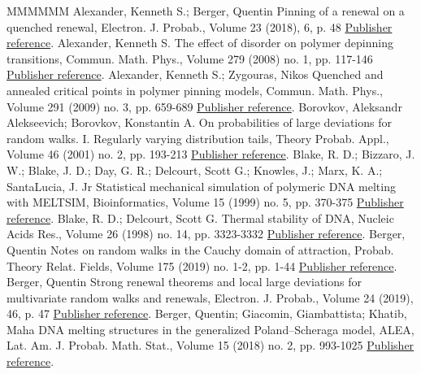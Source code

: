 \begin{thebibliography}{MMMMMM}
 Alexander, Kenneth S.; Berger, Quentin Pinning of a renewal on a quenched renewal, Electron. J. Probab., Volume 23 (2018), 6, p. 48 \href{https://ahl.centre-mersenne.org/item/AHL_2020__3__299_0/#cf:AB18}{Publisher reference}.
 Alexander, Kenneth S. The effect of disorder on polymer depinning transitions, Commun. Math. Phys., Volume 279 (2008) no. 1, pp. 117-146 \href{https://ahl.centre-mersenne.org/item/AHL_2020__3__299_0/#cf:A08}{Publisher reference}.
 Alexander, Kenneth S.; Zygouras, Nikos Quenched and annealed critical points in polymer pinning models, Commun. Math. Phys., Volume 291 (2009) no. 3, pp. 659-689 \href{https://ahl.centre-mersenne.org/item/AHL_2020__3__299_0/#cf:AZ09}{Publisher reference}.
 Borovkov, Aleksandr Alekseevich; Borovkov, Konstantin A. On probabilities of large deviations for random walks. I. Regularly varying distribution tails, Theory Probab. Appl., Volume 46 (2001) no. 2, pp. 193-213 \href{https://ahl.centre-mersenne.org/item/AHL_2020__3__299_0/#cf:BB00}{Publisher reference}.
 Blake, R. D.; Bizzaro, J. W.; Blake, J. D.; Day, G. R.; Delcourt, Scott G.; Knowles, J.; Marx, K. A.; SantaLucia, J. Jr Statistical mechanical simulation of polymeric DNA melting with MELTSIM, Bioinformatics, Volume 15 (1999) no. 5, pp. 370-375 \href{https://ahl.centre-mersenne.org/item/AHL_2020__3__299_0/#cf:Blake2}{Publisher reference}.
 Blake, R. D.; Delcourt, Scott G. Thermal stability of DNA, Nucleic Acids Res., Volume 26 (1998) no. 14, pp. 3323-3332 \href{https://ahl.centre-mersenne.org/item/AHL_2020__3__299_0/#cf:Blake1}{Publisher reference}.
 Berger, Quentin Notes on random walks in the Cauchy domain of attraction, Probab. Theory Relat. Fields, Volume 175 (2019) no. 1-2, pp. 1-44 \href{https://ahl.centre-mersenne.org/item/AHL_2020__3__299_0/#cf:B17}{Publisher reference}.
 Berger, Quentin Strong renewal theorems and local large deviations for multivariate random walks and renewals, Electron. J. Probab., Volume 24 (2019), 46, p. 47 \href{https://ahl.centre-mersenne.org/item/AHL_2020__3__299_0/#cf:B}{Publisher reference}.
 Berger, Quentin; Giacomin, Giambattista; Khatib, Maha DNA melting structures in the generalized Poland–Scheraga model, ALEA, Lat. Am. J. Probab. Math. Stat., Volume 15 (2018) no. 2, pp. 993-1025 \href{https://ahl.centre-mersenne.org/item/AHL_2020__3__299_0/#cf:BGK}{Publisher reference}.

\end{thebibliography}
